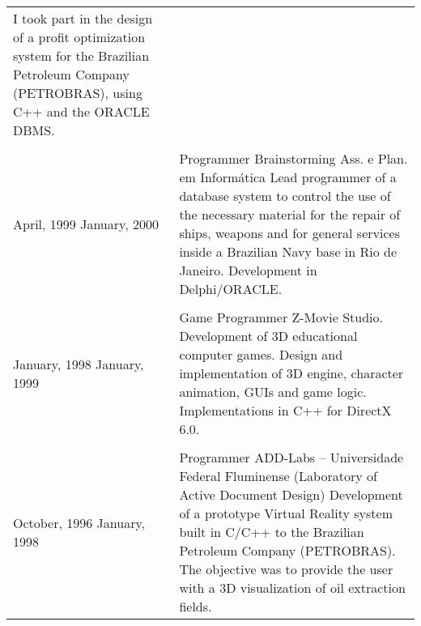 \begin{longtable}{p{} p{}}
I took part in the design of a profit optimization
system for the Brazilian Petroleum Company
(PETROBRAS), using C++ and the ORACLE DBMS.\\
\\
April, 1999 \newline January, 2000 & Programmer\newline
Brainstorming Ass. e Plan. em Inform\'atica\newline
Lead programmer of a database system to control 
the use of the necessary material for the repair of ships, weapons 
and for general services inside a Brazilian Navy base in Rio de Janeiro.
Development in Delphi/ORACLE.\\
\\
January, 1998 \newline January, 1999 & Game Programmer\newline
Z-Movie Studio.\newline
Development of 3D educational computer games. Design and
implementation of 3D engine, character animation, GUIs and game logic.
Implementations in C++ for DirectX 6.0.\\
\\
October, 1996 \newline January, 1998 & Programmer\newline
ADD-Labs -- Universidade Federal Fluminense (Laboratory of Active Document Design)\newline
Development of a prototype Virtual Reality system built in C/C++ to the Brazilian Petroleum 
Company (PETROBRAS). The objective was to provide the user with a 3D 
visualization of oil extraction fields.\\
\end{longtable}

